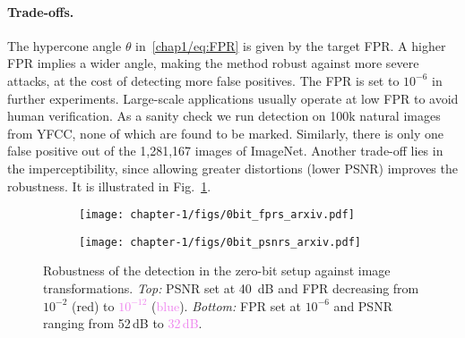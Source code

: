 \begin{table}[t!]
{
    }
\end{table}



\paragraph*{Trade-offs.}
The hypercone angle $\theta$ in~\eqref{chap1/eq:FPR} is given by the target FPR. %
A higher FPR implies a wider angle, making the method robust against more severe attacks, at the cost of detecting more false positives. 
The FPR is set to $10^{-6}$ in further experiments.
Large-scale applications usually operate at low FPR to avoid human verification.
As a sanity check we run detection on 100k natural images from YFCC, none of which are found to be marked. 
Similarly, there is only one false positive out of the 1,281,167 images of ImageNet.
Another trade-off lies in the imperceptibility, since allowing greater distortions (lower PSNR) improves the robustness.
It is illustrated in Fig.~\ref{chap1/fig:0bit_trade_offs}.


\begin{figure}[b!]
    \centering
    \begin{subfigure}[b]{0.95\linewidth}
        \texttt{[image: chapter-1/figs/0bit\_fprs\_arxiv.pdf]}
    \end{subfigure}
    \begin{subfigure}[b]{0.95\linewidth}
        \texttt{[image: chapter-1/figs/0bit\_psnrs\_arxiv.pdf]}
    \end{subfigure}
    \caption{Robustness of the detection in the zero-bit setup against image transformations. \emph{Top:} PSNR set at 40~dB and FPR decreasing from \textcolor{BrickRed}{$10^{-2}$} (\textcolor{BrickRed}{red}) to \textcolor{Violet}{$10^{-12}$} (\textcolor{Violet}{blue}). \emph{Bottom:} FPR set at $10^{-6}$ and PSNR ranging from \textcolor{BrickRed}{52\,dB} to \textcolor{Violet}{32\,dB}.
    }
    \label{chap1/fig:0bit_trade_offs}
\end{figure}


